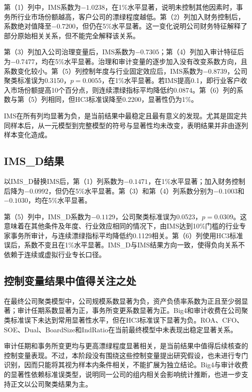 \documentclass[UTF8,12pt,a4paper]{ctexart}
\begin{document}
第（1）列中，IMS系数为$-1.0238$，在1\%水平显著，说明未控制其他因素时，事务所行业市场份额越高，客户公司的漂绿程度越低。第（2）列加入财务控制后，系数绝对值降至$-0.7200$，但仍在5\%水平显著。这一变化说明公司财务特征解释了部分原始相关关系，但不能完全解释该关系。

第（3）列加入公司治理变量后，IMS系数为$-0.7305$；第（4）列加入审计特征后为$-0.7477$，均在5\%水平显著。治理和审计变量的逐步加入没有改变系数方向，且系数变化较小。第（5）列控制年度与行业固定效应后，IMS系数为$-0.8739$，公司聚类标准误为0.3150，$p=0.0055$，在1\%水平显著。若IMS提高0.1，即行业客户收入市场份额提高10个百分点，则连续漂绿指标平均降低约$0.0874$。第（6）列的系数与第（5）列相同，但HC3标准误降至0.2200，显著性仍为1\%。

IMS在所有列均显著为负，是当前结果中最稳定且最有意义的发现。尤其是固定共同样本后，从一元模型到完整模型的符号与显著性均未改变，表明结果并非由逐列样本变化造成。

\subsection{IMS\_D结果}

以IMS\_D替换IMS后，第（1）列系数为$-0.1471$，在1\%水平显著；加入财务控制后降为$-0.0992$，但仍在5\%水平显著。第（3）和第（4）列系数分别为$-0.1003$和$-0.1030$，均在5\%水平显著。

第（5）列中，IMS\_D系数为$-0.1129$，公司聚类标准误为0.0523，$p=0.0309$。这意味着在其他条件及年度、行业效应相同的情况下，由IMS达到10\%门槛的行业专家事务所审计，与连续漂绿指标平均降低约0.1129相关。第（6）列使用HC3标准误后，系数不变且在1\%水平显著。IMS\_D与IMS结果方向一致，使得负向关系不依赖于连续或虚拟行业专长口径。

\subsection{控制变量结果中值得关注之处}

在最终公司聚类模型中，公司规模系数显著为负，资产负债率系数为正且至少弱显著；审计任期系数显著为正，事务所变更系数显著为正。Big4和审计收费在公司聚类标准误下未达到常用显著性水平，但在HC3标准误下显著为负。ROA、CFO、SOE、Dual、BoardSize和IndRatio在当前最终模型中未表现出稳定显著关系。

审计任期和事务所变更均与更高漂绿程度显著相关，是当前结果中值得后续核查的控制变量表现。不过，本阶段没有围绕这些控制变量提出研究假设，也未进行专门识别，因而只能将其视为样本内条件相关，不能扩展为独立结论。Big4与审计收费的显著性依赖标准误类型，说明同一公司的组内相关会影响统计推断，也进一步支持正文以公司聚类结果为主。
\end{document}

